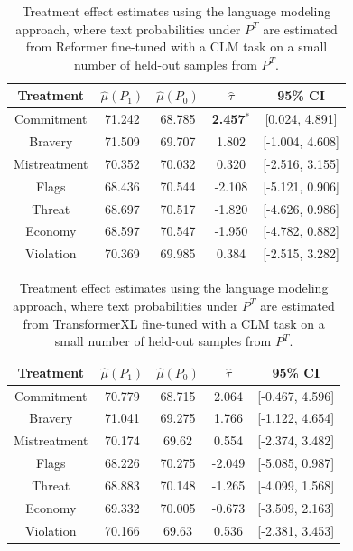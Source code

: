 \documentclass{article}
\begin{document}
\begin{table}[!ht]
    \centering
    \begin{tabular}{c|cccc}
        \toprule
        Treatment & $\hat{\mu}(P_1)$ & $\hat{\mu}(P_0)$ & $\hat{\tau}$ & 95\% CI \\
        \midrule
        Commitment & 71.242 & 68.785 & \textbf{\textcolor{green!50!black}{2.457$^*$}} & [0.024, 4.891] \\
        Bravery & 71.509 & 69.707 & \textcolor{green!50!black}{1.802} & [-1.004, 4.608] \\
        Mistreatment & 70.352 & 70.032 & \textcolor{green!50!black}{0.320} & [-2.516, 3.155] \\
        Flags & 68.436 & 70.544 & \textcolor{red!80!black}{-2.108} & [-5.121, 0.906] \\
        Threat & 68.697 & 70.517 & \textcolor{red!80!black}{-1.820} & [-4.626, 0.986]  \\
        Economy & 68.597 & 70.547 & \textcolor{red!80!black}{-1.950} & [-4.782, 0.882] \\
        Violation & 70.369 & 69.985 & \textcolor{green!50!black}{0.384} & [-2.515, 3.282] \\
        \bottomrule
    \end{tabular}
    \caption{Treatment effect estimates using the language modeling approach, where text probabilities under $P^T$ are estimated from Reformer fine-tuned with a CLM task on a small number of held-out samples from $P^T$.}
    \label{tab:results_clm_reformer}
\end{table}

\begin{table}[!ht]
    \centering
    \begin{tabular}{c|cccc}
        \toprule
        Treatment & $\hat{\mu}(P_1)$ & $\hat{\mu}(P_0)$ & $\hat{\tau}$ & 95\% CI \\
        \midrule
        Commitment & 70.779 & 68.715 & \textcolor{green!50!black}{2.064} & [-0.467, 4.596] \\
        Bravery & 71.041 & 69.275 & \textcolor{green!50!black}{1.766} & [-1.122, 4.654] \\
        Mistreatment & 70.174 & 69.62 & \textcolor{green!50!black}{0.554} & [-2.374, 3.482] \\
        Flags & 68.226 & 70.275 & \textcolor{red!80!black}{-2.049} & [-5.085, 0.987] \\
        Threat & 68.883 & 70.148 & \textcolor{red!80!black}{-1.265} & [-4.099, 1.568]  \\
        Economy & 69.332 & 70.005 & \textcolor{red!80!black}{-0.673} & [-3.509, 2.163] \\
        Violation & 70.166 & 69.63 & \textcolor{green!50!black}{0.536} & [-2.381, 3.453] \\
        \bottomrule
    \end{tabular}
    \caption{Treatment effect estimates using the language modeling approach, where text probabilities under $P^T$ are estimated from TransformerXL fine-tuned with a CLM task on a small number of held-out samples from $P^T$.}
    \label{tab:results_clm_transformerxl}
\end{table}
\end{document}
